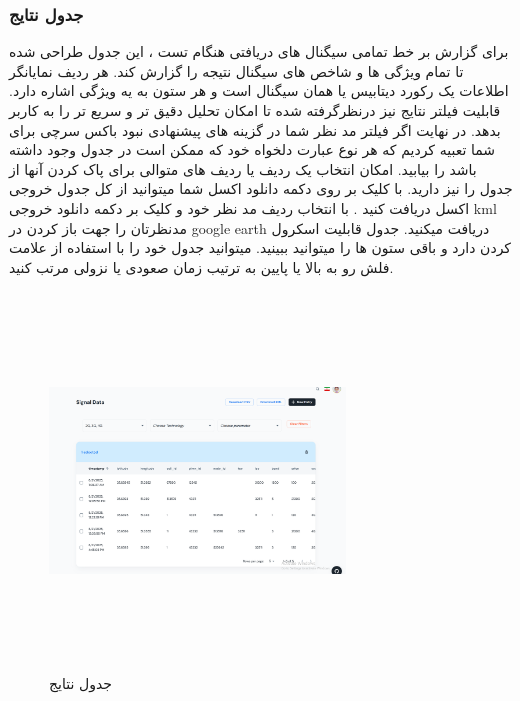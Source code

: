 \documentclass{report}
\begin{document}
\subsubsection{جدول نتایج}
برای گزارش بر خط تمامی سیگنال های دریافتی هنگام تست ، این جدول طراحی شده تا تمام ویژگی ها و شاخص های سیگنال نتیجه را گزارش کند.
هر ردیف نمایانگر اطلاعات یک رکورد دیتابیس یا همان سیگنال است و هر ستون به یه ویژگی اشاره دارد.
قابلیت فیلتر نتایج نیز درنظرگرفته شده تا امکان تحلیل دقیق تر و سریع تر را به کاربر بدهد.
در نهایت اگر فیلتر مد نظر شما در گزینه های پیشنهادی نبود باکس سرچی برای شما تعبیه کردیم که هر نوع عبارت دلخواه خود که ممکن است در جدول وجود داشته باشد را بیابید.
امکان انتخاب یک ردیف یا ردیف های متوالی برای پاک کردن آنها از جدول را نیز دارید.
با کلیک بر روی دکمه دانلود اکسل شما میتوانید از کل جدول خروجی اکسل دریافت کنید .
با انتخاب ردیف مد نظر خود و کلیک بر دکمه دانلود خروجی kml  مدنظرتان را جهت باز کردن در google earth دریافت میکنید.
جدول قابلیت اسکرول کردن دارد و باقی ستون ها را میتوانید ببینید.
میتوانید جدول خود را با استفاده از علامت فلش رو به بالا یا پایین به ترتیب زمان صعودی یا نزولی مرتب کنید.

\begin{figure}[!htbp]
	\centering
	\includegraphics[width=0.7\textwidth,height=10cm,keepaspectratio]{Pic/final_table}
	\caption{جدول نتایج}
	\label{fig:table}
\end{figure}
\end{document}
